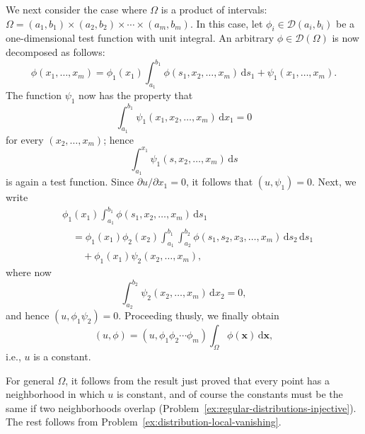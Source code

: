 \begin{Proof}
We next consider the case where $\Omega$ is a product of intervals: $\Omega=(a_1,b_1)\times(a_2,b_2)\times\cdots\times(a_m,b_m)$. In this case, let $\phi_i\in\mathcal{D}(a_i,b_i)$ be a one-dimensional test function with unit integral. An arbitrary $\phi\in\mathcal{D}(\Omega)$ is now decomposed as follows:
\begin{equation}\label{eq:test-function-product-domain-first-decomposition}
\phi(x_1,\ldots,x_m)=\phi_1(x_1)\int_{a_1}^{b_1}\phi(s_1,x_2,\ldots,x_m)\,\mathrm{d}s_1+\psi_1(x_1,\ldots,x_m).
\end{equation}
The function $\psi_1$ now has the property that
\begin{equation}\label{eq:test-function-first-remainder-zero-integral}
\int_{a_1}^{b_1}\psi_1(x_1,x_2,\ldots,x_m)\,\mathrm{d}x_1=0
\end{equation}
for every $(x_2,\ldots,x_m)$; hence
\begin{equation}\label{eq:test-function-first-remainder-primitive}
\int_{a_1}^{x_1}\psi_1(s,x_2,\ldots,x_m)\,\mathrm{d}s
\end{equation}
is again a test function. Since $\partial u/\partial x_1=0$, it follows that $(u,\psi_1)=0$. Next, we write
\begin{equation}\label{eq:test-function-product-domain-second-decomposition}
\begin{aligned}
&\phi_1(x_1)\int_{a_1}^{b_1}\phi(s_1,x_2,\ldots,x_m)\,\mathrm{d}s_1\\
&\quad=\phi_1(x_1)\phi_2(x_2)\int_{a_1}^{b_1}\int_{a_2}^{b_2}\phi(s_1,s_2,x_3,\ldots,x_m)\,\mathrm{d}s_2\,\mathrm{d}s_1\\
&\qquad+\phi_1(x_1)\psi_2(x_2,\ldots,x_m),
\end{aligned}
\end{equation}
where now
\begin{equation}\label{eq:test-function-second-remainder-zero-integral}
\int_{a_2}^{b_2}\psi_2(x_2,\ldots,x_m)\,\mathrm{d}x_2=0,
\end{equation}
and hence $(u,\phi_1\psi_2)=0$. Proceeding thusly, we finally obtain
\begin{equation}\label{eq:zero-gradient-distribution-product-pairing}
(u,\phi)=(u,\phi_1\phi_2\cdots\phi_m)\int_\Omega\phi(\bm{x})\,\mathrm{d}\bm{x},
\end{equation}
i.e., $u$ is a constant.

For general $\Omega$, it follows from the result just proved that every point has a neighborhood in which $u$ is constant, and of course the constants must be the same if two neighborhoods overlap (Problem~\ref{ex:regular-distributions-injective}). The rest follows from Problem~\ref{ex:distribution-local-vanishing}.
\end{Proof}

